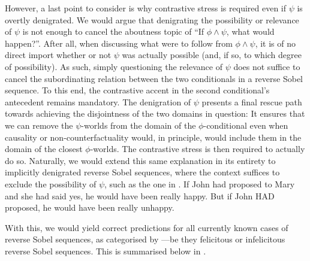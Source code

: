 \noindent However, a last point to consider is why contrastive stress is required even if $\psi$ is overtly denigrated. We would argue that denigrating the possibility or relevance of $\psi$ is not enough to cancel the aboutness topic of \enquote{If $\phi\land\psi$, what would happen?}. After all, when discussing what were to follow from $\phi\land\psi$, it is of no direct import whether or not $\psi$ was actually possible (and, if so, to which degree of possibility). As such, simply questioning the relevance of $\psi$ does not suffice to cancel the subordinating relation between the two conditionals in a reverse Sobel sequence. To this end, the contrastive accent in the second conditional's antecedent remains mandatory. The denigration of $\psi$ presents a final rescue path towards achieving the disjointness of the two domains in question: It ensures that we can remove the $\psi$-worlds from the domain of the $\phi$-conditional even when causality or non-counterfactuality would, in principle, would include them in the domain of the closest $\phi$-worlds. The contrastive stress is then required to actually do so. Naturally, we would extend this same explanation in its entirety to implicitly denigrated reverse Sobel sequences, where the context suffices to exclude the possibility of $\psi$, such as the one in .
\pex{}\label{ex:moss1}
\a{} If John had proposed to Mary and she had said yes, he would have been really happy.
\a{} But if John \MakeUppercase{had} proposed, he would have been really unhappy.\\\emptyfill\parencite[adopted from][p.~577]{Moss2012}
\xe

With this, we would yield correct predictions for all currently known cases of reverse Sobel sequences, as categorised by ---be they felicitous or infelicitous reverse Sobel sequences. This is summarised below in .
\begin{table}[!htb]
\end{table}

